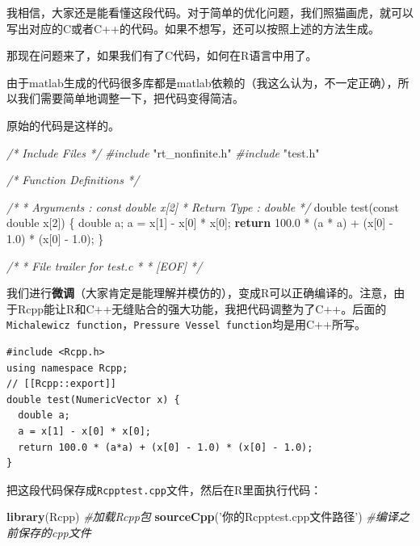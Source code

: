 \documentclass[]{ctexbook}
\newenvironment{Shaded}{\begin{snugshade}}{\end{snugshade}}
\newcommand{\KeywordTok}[1]{\textcolor[rgb]{0.13,0.29,0.53}{\textbf{#1}}}
\newcommand{\DataTypeTok}[1]{\textcolor[rgb]{0.13,0.29,0.53}{#1}}
\newcommand{\DecValTok}[1]{\textcolor[rgb]{0.00,0.00,0.81}{#1}}
\newcommand{\FloatTok}[1]{\textcolor[rgb]{0.00,0.00,0.81}{#1}}
\newcommand{\StringTok}[1]{\textcolor[rgb]{0.31,0.60,0.02}{#1}}
\newcommand{\ImportTok}[1]{#1}
\newcommand{\CommentTok}[1]{\textcolor[rgb]{0.56,0.35,0.01}{\textit{#1}}}
\newcommand{\ControlFlowTok}[1]{\textcolor[rgb]{0.13,0.29,0.53}{\textbf{#1}}}
\newcommand{\PreprocessorTok}[1]{\textcolor[rgb]{0.56,0.35,0.01}{\textit{#1}}}
\newcommand{\NormalTok}[1]{#1}
\theoremstyle{definition}
\theoremstyle{definition}
\theoremstyle{definition}
\theoremstyle{remark}
\begin{document}
我相信，大家还是能看懂这段代码。对于简单的优化问题，我们照猫画虎，就可以写出对应的C或者C++的代码。如果不想写，还可以按照上述的方法生成。

那现在问题来了，如果我们有了C代码，如何在R语言中用了。

由于matlab生成的代码很多库都是matlab依赖的（我这么认为，不一定正确），所以我们需要简单地调整一下，把代码变得简洁。

原始的代码是这样的。

\begin{Shaded}
\begin{Highlighting}[]
\CommentTok{/* Include Files */}
\PreprocessorTok{#include }\ImportTok{"rt_nonfinite.h"}
\PreprocessorTok{#include }\ImportTok{"test.h"}

\CommentTok{/* Function Definitions */}

\CommentTok{/*}
\CommentTok{ * Arguments    : const double x[2]}
\CommentTok{ * Return Type  : double}
\CommentTok{ */}
\DataTypeTok{double}\NormalTok{ test(}\DataTypeTok{const} \DataTypeTok{double}\NormalTok{ x[}\DecValTok{2}\NormalTok{])}
\NormalTok{\{}
  \DataTypeTok{double}\NormalTok{ a;}
\NormalTok{  a = x[}\DecValTok{1}\NormalTok{] - x[}\DecValTok{0}\NormalTok{] * x[}\DecValTok{0}\NormalTok{];}
  \ControlFlowTok{return} \FloatTok{100.0}\NormalTok{ * (a * a) + (x[}\DecValTok{0}\NormalTok{] - }\FloatTok{1.0}\NormalTok{) * (x[}\DecValTok{0}\NormalTok{] - }\FloatTok{1.0}\NormalTok{);}
\NormalTok{\}}

\CommentTok{/*}
\CommentTok{ * File trailer for test.c}
\CommentTok{ *}
\CommentTok{ * [EOF]}
\CommentTok{ */}
\end{Highlighting}
\end{Shaded}

我们进行\textbf{微调}（大家肯定是能理解并模仿的），变成R可以正确编译的。注意，由于Rcpp能让R和C++无缝贴合的强大功能，我把代码调整为了C++。后面的\texttt{Michalewicz\ function}，\texttt{Pressure\ Vessel\ function}均是用C++所写。

\begin{verbatim}
#include <Rcpp.h>
using namespace Rcpp;
// [[Rcpp::export]]
double test(NumericVector x) {
  double a;
  a = x[1] - x[0] * x[0];
  return 100.0 * (a*a) + (x[0] - 1.0) * (x[0] - 1.0);
}
\end{verbatim}

把这段代码保存成\texttt{Rcpptest.cpp}文件，然后在R里面执行代码：

\begin{Shaded}
\begin{Highlighting}[]
\KeywordTok{library}\NormalTok{(Rcpp) }\CommentTok{#加载Rcpp包}
\KeywordTok{sourceCpp}\NormalTok{(}\StringTok{'你的Rcpptest.cpp文件路径'}\NormalTok{) }\CommentTok{#编译之前保存的cpp文件}
\end{Highlighting}
\end{Shaded}
\end{document}
